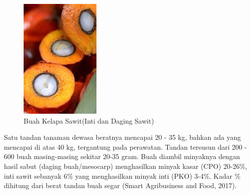 \begin{figure}[H]
	\vspace{-0.1cm}
	\begin{center}
		\includegraphics[width=0.3\columnwidth]{bab2/Gambar/Picture47.jpg}
	\end{center}
	\vspace{-0.2cm}
	\captionsetup{justification=centering}
	\caption{Buah Kelapa Sawit(Inti dan Daging Sawit)}\label{img:Buah-Kelapa-Sawit}
\end{figure}

Satu tandan tanaman dewasa beratnya mencapai 20 - 35 kg, bahkan ada yang mencapai di atas 40 kg, tergantung pada perawatan. Tandan tersusun dari 200 - 600 buah masing-masing sekitar 20-35 gram. Buah diambil minyaknya dengan hasil sabut (daging buah/mesocarp) menghasilkan minyak kasar (CPO) 20-26\%, inti sawit sebanyak 6\% yang menghasilkan minyak inti (PKO) 3-4\%. Kadar \% dihitung dari berat tandan buah segar (Smart Agribusiness and Food, 2017).

